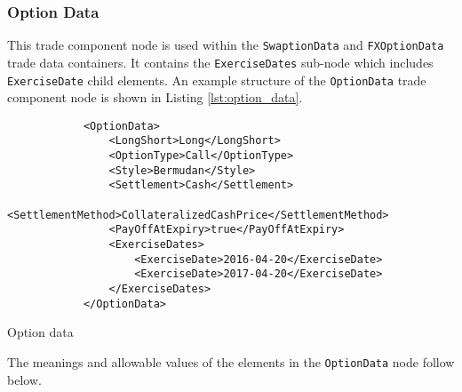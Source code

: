 \subsubsection{Option Data}
\label{ss:option_data} 
This trade component node is used within the \lstinline!SwaptionData! and \lstinline!FXOptionData! trade data
containers. It contains the \lstinline!ExerciseDates! sub-node which includes \lstinline!ExerciseDate! child
elements. An example structure of the \lstinline!OptionData! trade component node is shown in Listing
\ref{lst:option_data}.

\begin{listing}[H]
\begin{verbatim}
            <OptionData>
                <LongShort>Long</LongShort>
                <OptionType>Call</OptionType>
                <Style>Bermudan</Style>
                <Settlement>Cash</Settlement>
                <SettlementMethod>CollateralizedCashPrice</SettlementMethod>
                <PayOffAtExpiry>true</PayOffAtExpiry>
                <ExerciseDates>
                    <ExerciseDate>2016-04-20</ExerciseDate>
                    <ExerciseDate>2017-04-20</ExerciseDate>
                </ExerciseDates>
            </OptionData>
\end{verbatim}
\caption{Option data}
\label{lst:option_data}
\end{listing}

The meanings and allowable values of the elements in the \lstinline!OptionData! node follow below.

